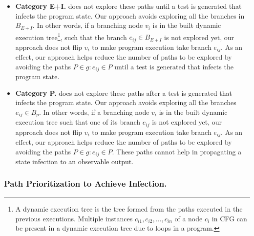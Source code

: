 \begin{itemize}
\item \textbf{Category E+I.}  does not explore these paths until a test 
is generated that infects the program state. Our approach avoids exploring all the branches in $B_{E+I}$. In other words, if a branching node $v_i$ is in the built dynamic execution tree\footnote{\scriptsize{A dynamic execution tree is the tree formed from the paths executed in the previous executions. Multiple instances $c_{i1}, c_{i2}, ..., c_{in}$ of a node $c_i$ in CFG can be present in a dynamic execution tree due to loops in a program.}}, such that the branch $e_{ij} \in B_{E+I}$ is not explored yet, our approach does not flip $v_i$ to make program execution take branch $e_{ij}$.
As an effect, our approach helps reduce the number of paths to be explored by avoiding the paths $P \in g : e_{ij} \in P$ until a test is generated that infects the program state.
\item \textbf{Category P. }
 does not explore these paths after a test is generated that infects the program state.
Our approach avoids exploring all the branches 
$e_{ij}\in B_p$. In other words, if a branching node $v_i$ is in the built dynamic execution tree such that one of its branch $e_{ij}$ is not explored yet, our approach does not flip $v_i$ to make program execution take branch $e_{ij}$.
As an effect, our approach helps reduce the number of paths to be explored by avoiding the paths $P \in g : e_{ij} \in P$.
These paths cannot help in propagating a state infection to an observable output.
\end{itemize}

\subsubsection{Path Prioritization to Achieve Infection.}

